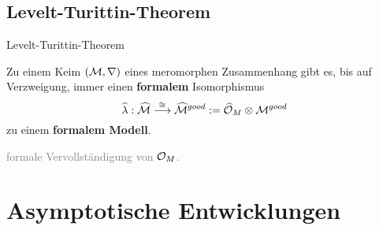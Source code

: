 \subsection{Levelt-Turittin-Theorem}
\begin{frame}{Levelt-Turittin-Theorem}
  \begin{tthm}
    Zu einem Keim $(\mathcal{M},\nabla)$ eines meromorphen Zusammenhang gibt es, bis
    auf Verzweigung, immer einen \textbf{formalem} Isomorphismus
    \[
      \hat\lambda:\hat\cM
      \overset{\cong}\longrightarrow
      \hat\cM^{good}
      :=~\tikzmark{e1}\!\!\hat\cO_M\otimes\cM^{good}
    \]
    zu einem \textbf{formalem Modell}.
  \end{tthm}
  \begin{flushright}
    \textcolor{gray}{formale Vervollständigung von $\mathcal{O}_M$.}
  \end{flushright}
\end{frame}

\section{Asymptotische Entwicklungen}
